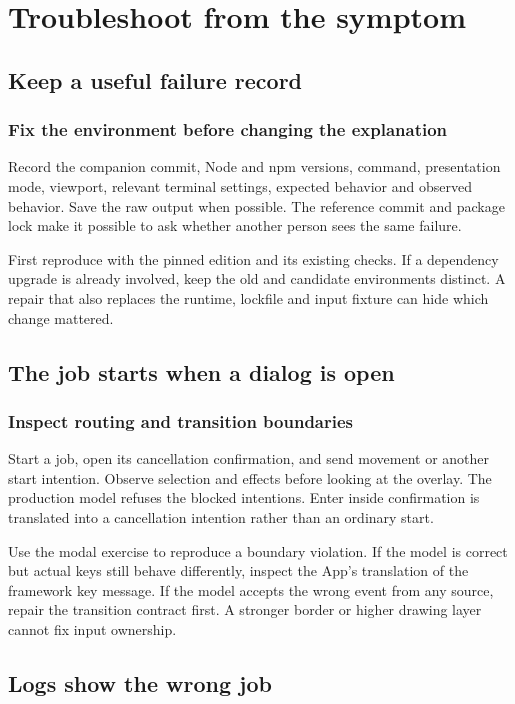 \chapter{Troubleshoot from the symptom}\label{teaching-troubleshooting}

\section{Keep a useful failure record}
\subsection{Fix the environment before changing the explanation}

Record the companion commit, Node and npm versions, command, presentation mode, viewport, relevant terminal settings, expected behavior and observed behavior. Save the raw output when possible. The reference commit and package lock make it possible to ask whether another person sees the same failure.

First reproduce with the pinned edition and its existing checks. If a dependency upgrade is already involved, keep the old and candidate environments distinct. A repair that also replaces the runtime, lockfile and input fixture can hide which change mattered.

\section{The job starts when a dialog is open}
\subsection{Inspect routing and transition boundaries}

Start a job, open its cancellation confirmation, and send movement or another start intention. Observe selection and effects before looking at the overlay. The production model refuses the blocked intentions. Enter inside confirmation is translated into a cancellation intention rather than an ordinary start.

Use the modal exercise to reproduce a boundary violation. If the model is correct but actual keys still behave differently, inspect the App's translation of the framework key message. If the model accepts the wrong event from any source, repair the transition contract first. A stronger border or higher drawing layer cannot fix input ownership.

\section{Logs show the wrong job}
